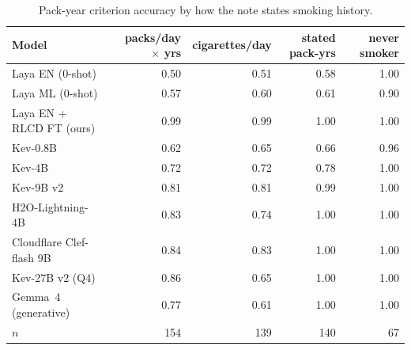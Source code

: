 \begin{table}[t]\centering\small
\caption{Pack-year criterion accuracy by how the note states smoking history.}\label{tab:forms}
\begin{tabular}{lrrrr}\toprule Model & packs/day $\times$ yrs & cigarettes/day & stated pack-yrs & never smoker \\ \midrule
Laya EN (0-shot) & 0.50 & 0.51 & 0.58 & 1.00 \\
Laya ML (0-shot) & 0.57 & 0.60 & 0.61 & 0.90 \\
Laya EN + RLCD FT (ours) & 0.99 & 0.99 & 1.00 & 1.00 \\
Kev-0.8B & 0.62 & 0.65 & 0.66 & 0.96 \\
Kev-4B & 0.72 & 0.72 & 0.78 & 1.00 \\
Kev-9B v2 & 0.81 & 0.81 & 0.99 & 1.00 \\
H2O-Lightning-4B & 0.83 & 0.74 & 1.00 & 1.00 \\
Cloudflare Clef-flash 9B & 0.84 & 0.83 & 1.00 & 1.00 \\
Kev-27B v2 (Q4) & 0.86 & 0.65 & 1.00 & 1.00 \\
Gemma~4 (generative) & 0.77 & 0.61 & 1.00 & 1.00 \\
\midrule $n$ & 154 & 139 & 140 & 67 \\
\bottomrule\end{tabular}\end{table}